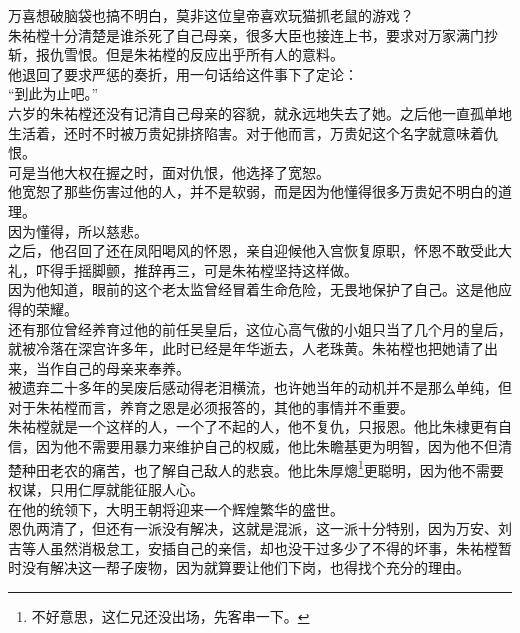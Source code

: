 \begin{multicols}{\theparacolNo}
万喜想破脑袋也搞不明白，莫非这位皇帝喜欢玩猫抓老鼠的游戏？\\

朱祐樘十分清楚是谁杀死了自己母亲，很多大臣也接连上书，要求对万家满门抄斩，报仇雪恨。但是朱祐樘的反应出乎所有人的意料。\\

他退回了要求严惩的奏折，用一句话给这件事下了定论：\\

“到此为止吧。”\\

六岁的朱祐樘还没有记清自己母亲的容貌，就永远地失去了她。之后他一直孤单地生活着，还时不时被万贵妃排挤陷害。对于他而言，万贵妃这个名字就意味着仇恨。\\

可是当他大权在握之时，面对仇恨，他选择了宽恕。\\

他宽恕了那些伤害过他的人，并不是软弱，而是因为他懂得很多万贵妃不明白的道理。\\

因为懂得，所以慈悲。\\

之后，他召回了还在凤阳喝风的怀恩，亲自迎候他入宫恢复原职，怀恩不敢受此大礼，吓得手摇脚颤，推辞再三，可是朱祐樘坚持这样做。\\

因为他知道，眼前的这个老太监曾经冒着生命危险，无畏地保护了自己。这是他应得的荣耀。\\

还有那位曾经养育过他的前任吴皇后，这位心高气傲的小姐只当了几个月的皇后，就被冷落在深宫许多年，此时已经是年华逝去，人老珠黄。朱祐樘也把她请了出来，当作自己的母亲来奉养。\\

被遗弃二十多年的吴废后感动得老泪横流，也许她当年的动机并不是那么单纯，但对于朱祐樘而言，养育之恩是必须报答的，其他的事情并不重要。\\

朱祐樘就是一个这样的人，一个了不起的人，他不复仇，只报恩。他比朱棣更有自信，因为他不需要用暴力来维护自己的权威，他比朱瞻基更为明智，因为他不但清楚种田老农的痛苦，也了解自己敌人的悲哀。他比朱厚熜\footnote{不好意思，这仁兄还没出场，先客串一下。}更聪明，因为他不需要权谋，只用仁厚就能征服人心。\\

在他的统领下，大明王朝将迎来一个辉煌繁华的盛世。\\

恩仇两清了，但还有一派没有解决，这就是混派，这一派十分特别，因为万安、刘吉等人虽然消极怠工，安插自己的亲信，却也没干过多少了不得的坏事，朱祐樘暂时没有解决这一帮子废物，因为就算要让他们下岗，也得找个充分的理由。\\


\end{multicols}
